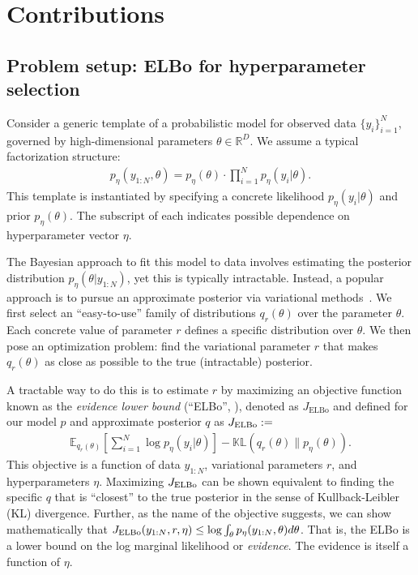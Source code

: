 \section{Contributions}
\label{sec:contributions}

\subsection{Problem setup: ELBo for hyperparameter selection}

Consider a generic template of a probabilistic model for observed data $\{y_i \}_{i=1}^N$, governed by high-dimensional parameters $\theta \in \mathbb{R}^D$. We assume a typical factorization structure:
\begin{align}
    p_{\eta}( y_{1:N}, \theta) = p_{\eta}(\theta ) \cdot  \textstyle \prod_{i=1}^N p_{\eta}( y_i | \theta).
\end{align}
This template is instantiated by specifying a concrete likelihood $p_{\eta}(y_i | \theta)$ and prior $p_{\eta}(\theta)$. The subscript of each indicates possible dependence on hyperparameter vector $\eta$.

The Bayesian approach to fit this model to data involves estimating the posterior distribution $p_{\eta}( \theta | y_{1:N})$, yet this is typically intractable. Instead, a popular approach is to pursue an approximate posterior via variational methods~\citep{blei2017variational,jordan1999introduction}. We first select an ``easy-to-use'' family of distributions $q_r(\theta)$ over the parameter $\theta$. Each concrete value of parameter $r$ defines a specific distribution over $\theta$. We then pose an optimization problem: find the variational parameter $r$ that makes $q_r(\theta)$ as close as possible to the true (intractable) posterior. %

A tractable way to do this is to estimate $r$ by maximizing an objective function known as the \emph{evidence lower bound} (``ELBo'', \citep{blei2017variational}), denoted as $J_{\text{ELBo}}$ and defined for our model $p$ and approximate posterior $q$ as $J_{\text{ELBo}} :=$
\begin{align}
    \label{eq:elbo_objective_generic}
    \mathbb{E}_{q_{r}(\theta)} \left[ \sum_{i=1}^{N} \log p_{\eta}(y_i | \theta) \right] - \mathbb{KL}(q_{r}(\theta) \| p_{\eta}(\theta)).
\end{align}
This objective is a function of data $y_{1:N}$, variational parameters $r$, and hyperparameters $\eta$. Maximizing $J_{\text{ELBo}}$ can be shown equivalent to finding the specific $q$ that is ``closest'' to the true posterior in the sense of Kullback-Leibler (KL) divergence. Further, as the name of the objective suggests, we can show mathematically that $J_{\text{ELBo}}( y_{1:N}, r, \eta ) \leq \log \int_{\theta} p_{\eta}( y_{1:N}, \theta) d\theta$. That is, the ELBo is a lower bound on the log marginal likelihood or \emph{evidence}. The evidence is itself a function of $\eta$.

